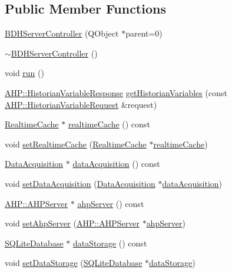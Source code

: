 \subsection*{Public Member Functions}
\begin{DoxyCompactItemize}
\item 
\hyperlink{class_b_d_h_server_controller_ab1026769dfdca9e1b7e8a374560b52ef}{B\+D\+H\+Server\+Controller} (Q\+Object $\ast$parent=0)
\item 
\hyperlink{class_b_d_h_server_controller_a5e403d5cade415ba5f4f2eeffb049bb2}{$\sim$\+B\+D\+H\+Server\+Controller} ()
\item 
void \hyperlink{class_b_d_h_server_controller_ae5ec3362fa06213b186b964a45e0bd85}{run} ()
\item 
\hyperlink{class_a_h_p_1_1_historian_variable_response}{A\+H\+P\+::\+Historian\+Variable\+Response} \hyperlink{class_b_d_h_server_controller_a47be08818ba04f2c06a2f9140313a225}{get\+Historian\+Variables} (const \hyperlink{class_a_h_p_1_1_historian_variable_request}{A\+H\+P\+::\+Historian\+Variable\+Request} \&request)
\item 
\hyperlink{class_realtime_cache}{Realtime\+Cache} $\ast$ \hyperlink{class_b_d_h_server_controller_a3fb2265d7096af182f19f0697e6df3d8}{realtime\+Cache} () const 
\item 
void \hyperlink{class_b_d_h_server_controller_a12954578ee7e529bf3b8f940f490f12a}{set\+Realtime\+Cache} (\hyperlink{class_realtime_cache}{Realtime\+Cache} $\ast$\hyperlink{class_b_d_h_server_controller_a3fb2265d7096af182f19f0697e6df3d8}{realtime\+Cache})
\item 
\hyperlink{class_data_acquisition}{Data\+Acquisition} $\ast$ \hyperlink{class_b_d_h_server_controller_a695f86821884ab92eb735db30b1038bb}{data\+Acquisition} () const 
\item 
void \hyperlink{class_b_d_h_server_controller_a507d0cc12001b41b3c2cb6fe42010911}{set\+Data\+Acquisition} (\hyperlink{class_data_acquisition}{Data\+Acquisition} $\ast$\hyperlink{class_b_d_h_server_controller_a695f86821884ab92eb735db30b1038bb}{data\+Acquisition})
\item 
\hyperlink{class_a_h_p_1_1_a_h_p_server}{A\+H\+P\+::\+A\+H\+P\+Server} $\ast$ \hyperlink{class_b_d_h_server_controller_a1e203fd9076f8f3dc61d044c72d21d53}{ahp\+Server} () const 
\item 
void \hyperlink{class_b_d_h_server_controller_a55e5a5c4ea725468910160d792b56ced}{set\+Ahp\+Server} (\hyperlink{class_a_h_p_1_1_a_h_p_server}{A\+H\+P\+::\+A\+H\+P\+Server} $\ast$\hyperlink{class_b_d_h_server_controller_a1e203fd9076f8f3dc61d044c72d21d53}{ahp\+Server})
\item 
\hyperlink{class_s_q_lite_database}{S\+Q\+Lite\+Database} $\ast$ \hyperlink{class_b_d_h_server_controller_aad6e39c87a630c3c672cd50654537945}{data\+Storage} () const 
\item 
void \hyperlink{class_b_d_h_server_controller_a4150ebf1a1de7fba264db6ef338d4bbc}{set\+Data\+Storage} (\hyperlink{class_s_q_lite_database}{S\+Q\+Lite\+Database} $\ast$\hyperlink{class_b_d_h_server_controller_aad6e39c87a630c3c672cd50654537945}{data\+Storage})
\end{DoxyCompactItemize}


